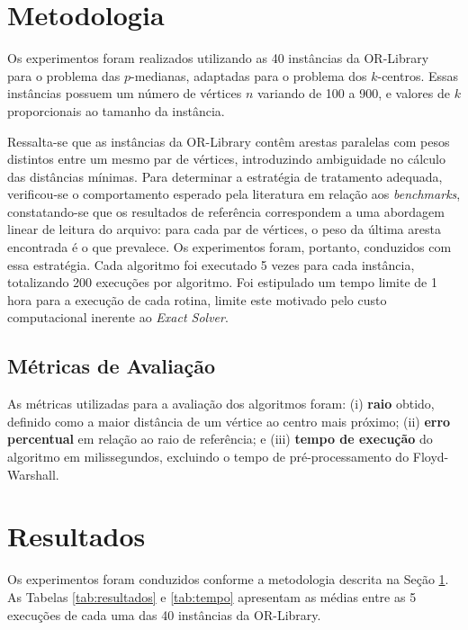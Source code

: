 \documentclass[12pt]{article}
\begin{document}
\section{Metodologia} \label{metodologia}

Os experimentos foram realizados utilizando as 40 instâncias da OR-Library~\cite{beasley1990} para o problema das $p$-medianas, adaptadas para o problema dos $k$-centros. Essas instâncias possuem um número de vértices $n$ variando de 100 a 900, e valores de $k$ proporcionais ao tamanho da instância.

Ressalta-se que as instâncias da OR-Library contêm arestas paralelas com pesos distintos entre um mesmo par de vértices, introduzindo ambiguidade no cálculo das distâncias mínimas. Para determinar a estratégia de tratamento adequada, verificou-se o comportamento esperado pela literatura em relação aos \textit{benchmarks}, constatando-se que os resultados de referência correspondem a uma abordagem linear de leitura do arquivo: para cada par de vértices, o peso da última aresta encontrada é o que prevalece. Os experimentos foram, portanto, conduzidos com essa estratégia.
Cada algoritmo foi executado 5 vezes para cada instância, totalizando 200 execuções por algoritmo. Foi estipulado um tempo limite de 1 hora para a execução de cada rotina, limite este motivado pelo custo computacional inerente ao \textit{Exact Solver}.

\subsection{Métricas de Avaliação}

As métricas utilizadas para a avaliação dos algoritmos foram: (i) \textbf{raio} obtido, definido como a maior distância de um vértice ao centro mais próximo; (ii) \textbf{erro percentual} em relação ao raio de referência; e (iii) \textbf{tempo de execução} do algoritmo em milissegundos, excluindo o tempo de pré-processamento do Floyd-Warshall.

\section{Resultados} \label{resultados}

Os experimentos foram conduzidos conforme a metodologia descrita na Seção \ref{metodologia}. As Tabelas \ref{tab:resultados} e \ref{tab:tempo} apresentam as médias entre as 5 execuções de cada uma das 40 instâncias da OR-Library.
\end{document}
